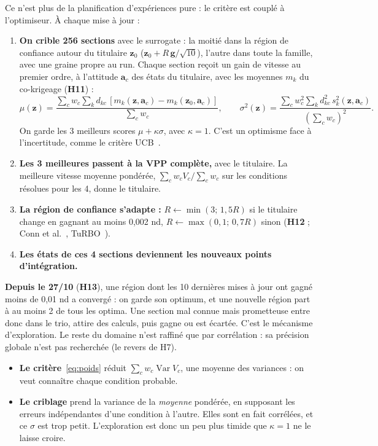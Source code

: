 \documentclass[11pt,a4paper]{article}
\newcommand{\vz}{\bm{z}}
\newcommand{\va}{\bm{a}}
\DeclareMathOperator{\Var}{Var}
\begin{document}
\begin{theorie}
Ce n'est plus de la planification d'expériences pure : le critère est couplé à l'optimiseur. À chaque mise à
jour :
\begin{enumerate}
  \item \textbf{On crible 256 sections} avec le surrogate : la moitié dans la région de confiance autour du
        titulaire $\vz_0$ ($\vz_0+R\,\bm g/\sqrt{10}$), l'autre dans toute la famille, avec une graine propre
        au run. Chaque section reçoit un gain de vitesse au premier ordre, à l'attitude $\va_c$ des états du
        titulaire, avec les moyennes $m_k$ du co-krigeage (\textbf{H11}) :
        \[
          \mu(\vz)=\frac{\sum_c w_c\sum_k d_{kc}\,[m_k(\vz,\va_c)-m_k(\vz_0,\va_c)]}{\sum_c w_c},\qquad
          \sigma^2(\vz)=\frac{\sum_c w_c^2\sum_k d_{kc}^2\,s_k^2(\vz,\va_c)}{(\sum_c w_c)^2}.
        \]
        On garde les 3 meilleurs scores $\mu+\kappa\sigma$, avec $\kappa=1$. C'est un optimisme face à
        l'incertitude, comme le critère UCB~\cite{Srinivas10}.
  \item \textbf{Les 3 meilleures passent à la VPP complète,} avec le titulaire. La meilleure vitesse moyenne
        pondérée, $\sum_c w_cV_c/\sum_c w_c$ sur les conditions résolues pour les 4, donne le titulaire.
  \item \textbf{La région de confiance s'adapte :} $R\leftarrow\min(3;\,1{,}5R)$ si le titulaire change en
        gagnant au moins 0,002 nd, $R\leftarrow\max(0{,}1;\,0{,}7R)$ sinon (\textbf{H12} ; Conn
        et al.~\cite{CGT00}, TuRBO~\cite{TuRBO19}).
  \item \textbf{Les états de ces 4 sections deviennent les nouveaux points d'intégration.}
\end{enumerate}
\textbf{Depuis le 27/10} (\textbf{H13}), une région dont les 10 dernières mises à jour ont gagné moins de
0,01 nd a convergé : on garde son optimum, et une nouvelle région part à au moins 2 de tous les optima.
Une section mal connue mais prometteuse entre donc dans le trio, attire des calculs, puis gagne ou est
écartée. C'est le mécanisme d'exploration. Le reste du domaine n'est raffiné que par corrélation : sa
précision globale n'est pas recherchée (le revers de H7).
\end{theorie}

\begin{subtilite}
\begin{itemize}
  \item \textbf{Le critère}~\eqref{eq:poids} réduit $\sum_c w_c\Var V_c$, une moyenne des variances : on veut
        connaître chaque condition probable.
  \item \textbf{Le criblage} prend la variance de la \emph{moyenne} pondérée, en supposant les erreurs
        indépendantes d'une condition à l'autre. Elles sont en fait corrélées, et ce $\sigma$ est trop petit.
        L'exploration est donc un peu plus timide que $\kappa=1$ ne le laisse croire.
\end{itemize}
\end{subtilite}
\end{document}
